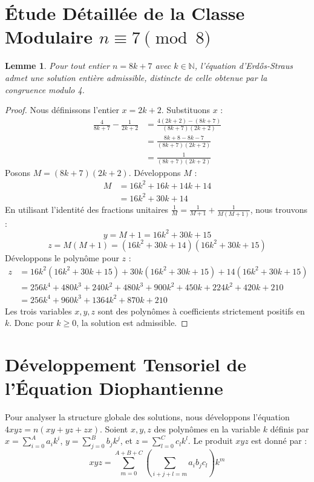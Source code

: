 \documentclass[11pt,a4paper]{article}
\newtheorem{lemma}{Lemme}
\begin{document}
\section{Étude Détaillée de la Classe Modulaire $n \equiv 7 \pmod 8$}
\begin{lemma}
Pour tout entier $n = 8k + 7$ avec $k \in \mathbb{N}$, l'équation d'Erd\H{{o}}s-Straus admet une solution entière admissible, distincte de celle obtenue par la congruence modulo 4.
\end{lemma}
\begin{proof}
Nous définissons l'entier $x = 2k + 2$. Substituons $x$ :
\begin{align*}
\frac{4}{8k+7} - \frac{1}{2k+2} &= \frac{4(2k+2) - (8k+7)}{(8k+7)(2k+2)} \\
&= \frac{8k + 8 - 8k - 7}{(8k+7)(2k+2)} \\
&= \frac{1}{(8k+7)(2k+2)}
\end{align*}
Posons $M = (8k+7)(2k+2)$. Développons $M$ :
\begin{align*}
M &= 16k^2 + 16k + 14k + 14 \\
&= 16k^2 + 30k + 14
\end{align*}
En utilisant l'identité des fractions unitaires $\frac{1}{M} = \frac{1}{M+1} + \frac{1}{M(M+1)}$, nous trouvons :
\begin{equation}
y = M + 1 = 16k^2 + 30k + 15
\end{equation}
\begin{equation}
z = M(M+1) = (16k^2 + 30k + 14)(16k^2 + 30k + 15)
\end{equation}
Développons le polynôme pour $z$ :
\begin{align*}
z &= 16k^2(16k^2 + 30k + 15) + 30k(16k^2 + 30k + 15) + 14(16k^2 + 30k + 15) \\
&= 256k^4 + 480k^3 + 240k^2 + 480k^3 + 900k^2 + 450k + 224k^2 + 420k + 210 \\
&= 256k^4 + 960k^3 + 1364k^2 + 870k + 210
\end{align*}
Les trois variables $x, y, z$ sont des polynômes à coefficients strictement positifs en $k$. Donc pour $k \ge 0$, la solution est admissible.
\end{proof}

\section{Développement Tensoriel de l'Équation Diophantienne}
Pour analyser la structure globale des solutions, nous développons l'équation $4xyz = n(xy + yz + zx)$.
Soient $x, y, z$ des polynômes en la variable $k$ définis par $x = \sum_{i=0}^A a_i k^i$, $y = \sum_{j=0}^B b_j k^j$, et $z = \sum_{l=0}^C c_l k^l$.
Le produit $xyz$ est donné par :
\begin{equation}
xyz = \sum_{m=0}^{A+B+C} \left( \sum_{i+j+l=m} a_i b_j c_l \right) k^m
\end{equation}
\end{document}
